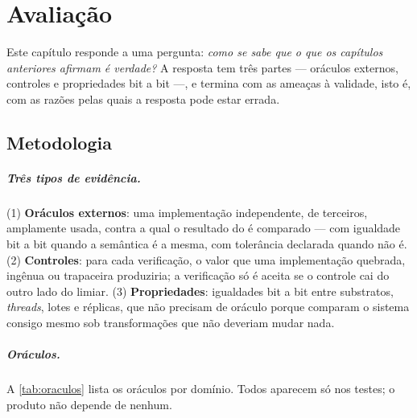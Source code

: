\chapter{Avaliação}\label{cap:avaliacao}

Este capítulo responde a uma pergunta: \emph{como se sabe que o que os capítulos anteriores afirmam é verdade?} A resposta tem três partes --- oráculos externos, controles e propriedades bit a bit ---, e termina com as ameaças à validade, isto é, com as razões pelas quais a resposta pode estar errada.

\section{Metodologia}\label{sec:aval-metodo}

\paragraph{Três tipos de evidência.} (1) \textbf{Oráculos externos}: uma implementação independente, de terceiros, amplamente usada, contra a qual o resultado do \vapor{} é comparado --- com igualdade bit a bit quando a semântica é a mesma, com tolerância declarada quando não é. (2) \textbf{Controles}: para cada verificação, o valor que uma implementação quebrada, ingênua ou trapaceira produziria; a verificação só é aceita se o controle cai do outro lado do limiar. (3) \textbf{Propriedades}: igualdades bit a bit entre substratos, \textit{threads}, lotes e réplicas, que não precisam de oráculo porque comparam o sistema consigo mesmo sob transformações que não deveriam mudar nada.

\paragraph{Oráculos.} A \autoref{tab:oraculos} lista os oráculos por domínio. Todos aparecem só nos testes; o produto não depende de nenhum.

